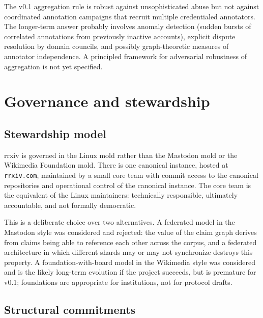 \documentclass[11pt]{rrxiv}
\begin{document}
\begin{openquestion}
\label{oq:aggregation-adversarial}
The v0.1 aggregation rule is robust against unsophisticated abuse but not against coordinated annotation campaigns that recruit multiple credentialed annotators. The longer-term answer probably involves anomaly detection (sudden bursts of correlated annotations from previously inactive accounts), explicit dispute resolution by domain councils, and possibly graph-theoretic measures of annotator independence. A principled framework for adversarial robustness of aggregation is not yet specified.
\end{openquestion}

\section{Governance and stewardship}
\label{sec:governance}

\subsection{Stewardship model}

rrxiv is governed in the Linux mold rather than the Mastodon mold or the Wikimedia Foundation mold. There is one canonical instance, hosted at \texttt{rrxiv.com}, maintained by a small core team with commit access to the canonical repositories and operational control of the canonical instance. The core team is the equivalent of the Linux maintainers: technically responsible, ultimately accountable, and not formally democratic.

This is a deliberate choice over two alternatives. A federated model in the Mastodon style was considered and rejected: the value of the claim graph derives from claims being able to reference each other across the corpus, and a federated architecture in which different shards may or may not synchronize destroys this property. A foundation-with-board model in the Wikimedia style was considered and is the likely long-term evolution if the project succeeds, but is premature for v0.1; foundations are appropriate for institutions, not for protocol drafts.

\subsection{Structural commitments}
\end{document}
